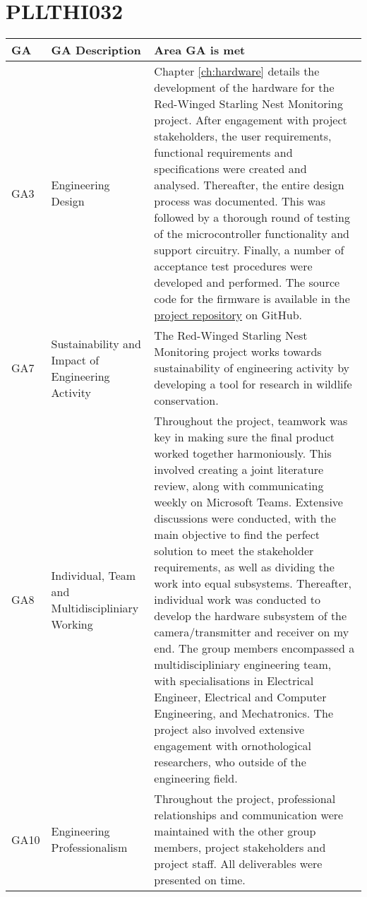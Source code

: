 \documentclass[class=report,11pt,crop=false]{standalone}
\begin{document}
\section{PLLTHI032}

\centering
\begin{tabularx}{\textwidth}{|p{} p{} X|}

    \hline
    \textbf{GA} & \textbf{GA Description} & \textbf{Area GA is met} \\ \hline

    GA3 & Engineering Design & Chapter \ref{ch:hardware} details the development of the hardware for the Red-Winged Starling Nest Monitoring project. After engagement with project stakeholders, the user requirements, functional requirements and specifications were created and analysed. Thereafter, the entire design process was documented. This was followed by a thorough round of testing of the microcontroller functionality and support circuitry. Finally, a number of acceptance test procedures were developed and performed. The source code for the firmware is available in the \href{https://github.com/rothdu/EEE4113F-Group13-2024}{project repository} on GitHub. \\ \hline

    GA7 & Sustainability and Impact of Engineering Activity & The Red-Winged Starling Nest Monitoring project works towards sustainability of engineering activity by developing a tool for research in wildlife conservation. \\ \hline

    GA8 & Individual, Team and Multidiscipliniary Working & Throughout the project, teamwork was key in making sure the final product worked together harmoniously. This involved creating a joint literature review, along with communicating weekly on Microsoft Teams. Extensive discussions were conducted, with the main objective to find the perfect solution to meet the stakeholder requirements, as well as dividing the work into equal subsystems. Thereafter, individual work was conducted to develop the hardware subsystem of the camera/transmitter and receiver on my end. The group members encompassed a multidiscipliniary engineering team, with specialisations in Electrical Engineer, Electrical and Computer Engineering, and Mechatronics. The project also involved extensive engagement with ornothological researchers, who outside of the engineering field. \\ \hline

    GA10 & Engineering Professionalism & Throughout the project, professional relationships and communication were maintained with the other group members, project stakeholders and project staff. All deliverables were presented on time. \\ \hline


\end{tabularx}
\raggedright

\ifstandalone

\printnoidxglossary[type=\acronymtype,nonumberlist]
\fi
\end{document}
